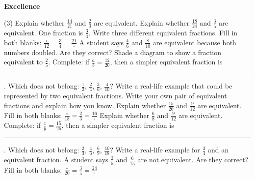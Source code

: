 \documentclass[17pt,a4paper,landscape]{extarticle}
\begin{document}
\sffamily
\boldmath

\boldmath

\boldmath

\boldmath

\boldmath

\boldmath

\boldmath

\boldmath

\boldmath

\boldmath

\boldmath

\boldmath

\boldmath

\boldmath

\boldmath

\boldmath

\boldmath

\boldmath

\boldmath

\boldmath

\boldmath

\boldmath

\vspace*{0.4em}
{\LARGE \textbf{Excellence}}
\begin{tasks}(3)
\task Explain whether \mbox{$\frac{14}{21}$} and \mbox{$\frac{2}{3}$} are equivalent.
\task Explain whether \mbox{$\frac{18}{24}$} and \mbox{$\frac{3}{5}$} are equivalent.
\task One fraction is \mbox{$\frac{3}{4}$}. Write three different equivalent fractions.
\task Fill in both blanks: \mbox{$\frac{\square}{12} = \frac{3}{4} = \frac{21}{\square}$}
\task A student says \mbox{$\frac{4}{6}$} and \mbox{$\frac{8}{10}$} are equivalent because both numbers doubled. Are they correct?
\task Shade a diagram to show a fraction equivalent to \mbox{$\frac{2}{5}$}.
\task Complete: if \mbox{$\frac{a}{b} = \frac{12}{20}$}, then a simpler equivalent fraction is \rule{2cm}{0.15mm}.
\task Which does not belong: \mbox{$\frac{1}{2}$}, \mbox{$\frac{2}{4}$}, \mbox{$\frac{3}{6}$}, \mbox{$\frac{4}{10}$}?
\task Write a real-life example that could be represented by two equivalent fractions.
\task Write your own pair of equivalent fractions and explain how you know.
\task Explain whether \mbox{$\frac{15}{20}$} and \mbox{$\frac{9}{12}$} are equivalent.
\task Fill in both blanks: \mbox{$\frac{\square}{18} = \frac{2}{3} = \frac{16}{\square}$}
\task Explain whether \mbox{$\frac{6}{8}$} and \mbox{$\frac{9}{12}$} are equivalent.
\task Complete: if \mbox{$\frac{x}{y} = \frac{15}{25}$}, then a simpler equivalent fraction is \rule{2cm}{0.15mm}.
\task Which does not belong: \mbox{$\frac{2}{3}$}, \mbox{$\frac{4}{6}$}, \mbox{$\frac{6}{9}$}, \mbox{$\frac{10}{18}$}?
\task Write a real-life example for \mbox{$\frac{3}{4}$} and an equivalent fraction.
\task A student says \mbox{$\frac{2}{5}$} and \mbox{$\frac{6}{15}$} are not equivalent. Are they correct?
\task Fill in both blanks: \mbox{$\frac{\square}{20} = \frac{3}{5} = \frac{24}{\square}$}
\end{tasks}
\end{document}
